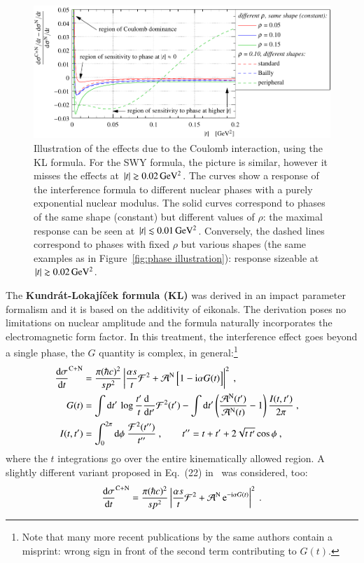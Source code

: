 \begin{figure}
\begin{center}
\includegraphics{fig/cni_effect_illustration.pdf}
\caption{%
Illustration of the effects due to the Coulomb interaction, using the KL formula. For the SWY formula, the picture is similar, however it misses the effects at $|t| \gtrsim 0.02\,{\rm GeV^2}$. The curves show a response of the interference formula to different nuclear phases with a purely exponential nuclear modulus. The solid curves correspond to phases of the same shape (constant) but different values of $\rho$: the maximal response can be seen at $|t| \lesssim 0.01\,{\rm GeV^2}$. Conversely, the dashed lines correspond to phases with fixed $\rho$ but various shapes (the same examples as in Figure~\ref{fig:phase illustration}): response sizeable at $|t| \gtrsim 0.02\,{\rm GeV^2}$.
}
\label{fig:cni effect}
\end{center}
\end{figure}

The {\bf Kundr\' at-Lokaj\' i\v cek formula (KL)} \cite{kl94} was derived in an impact parameter formalism and it is based on the additivity of eikonals. The derivation poses no limitations on nuclear amplitude and the formula naturally incorporates the electromagnetic form factor. In this treatment, the interference effect goes beyond a single phase, the $G$ quantity is complex, in general:\footnote{%
Note that many more recent publications by the same authors contain a misprint: wrong sign in front of the second term contributing to $G(t)$.
}
\begin{equation}
\label{eq:int kl}
	\begin{aligned}
		{\d\sigma\over \d t}^{\rm C+N} &= {\pi (\hbar c)^2 \over s p^2} \left | {\alpha s\over t} {\cal F}^2
			+ {\cal A}^{\rm N}\, \Big[1 - \I\alpha G(t)\Big] \right |^2\ ,\cr
		G(t) &= 
			\int \d t'\, \log {t'\over t} {\d\phantom{t'}\over \d t'} {\cal F}^2(t')
			- \int \d t' \left( {{\cal A}^{\rm N}(t') \over {\cal A}^{\rm N}(t)} - 1 \right) { I(t, t')\over 2\pi }
			\ ,\cr
		I(t, t') &= \int_0^{2\pi} \d\phi\ {{\cal F}^2(t'')\over t''}\ ,\qquad t'' = t + t' + 2\sqrt{t\, t'} \cos\phi\ ,\cr
	\end{aligned}
\end{equation}
where the $t$ integrations go over the entire kinematically allowed region. A slightly different variant proposed in Eq.~(22) in~\cite{kl05} was considered, too:
\begin{equation}
\label{eq:int kl exp}
	{\d\sigma\over \d t}^{\rm C+N} = {\pi (\hbar c)^2 \over s p^2} \left | {\alpha s\over t} {\cal F}^2
		+ {\cal A}^{\rm N}\, \e^{- \I\alpha G(t)} \right |^2 \ .
\end{equation}


